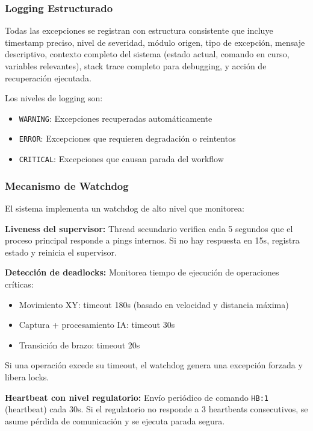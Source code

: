 \subsubsection{Logging Estructurado}

Todas las excepciones se registran con estructura consistente que incluye timestamp preciso, nivel de severidad, módulo origen, tipo de excepción, mensaje descriptivo, contexto completo del sistema (estado actual, comando en curso, variables relevantes), stack trace completo para debugging, y acción de recuperación ejecutada.

Los niveles de logging son:
\begin{itemize}[label=$\bullet$]
    \item \texttt{WARNING}: Excepciones recuperadas automáticamente
    \item \texttt{ERROR}: Excepciones que requieren degradación o reintentos
    \item \texttt{CRITICAL}: Excepciones que causan parada del workflow
\end{itemize}

\subsubsection{Mecanismo de Watchdog}

El sistema implementa un watchdog de alto nivel que monitorea:

\textbf{Liveness del supervisor:} Thread secundario verifica cada 5 segundos que el proceso principal responde a pings internos. Si no hay respuesta en 15s, registra estado y reinicia el supervisor.

\textbf{Detección de deadlocks:} Monitorea tiempo de ejecución de operaciones críticas:
\begin{itemize}[label=$\bullet$]
    \item Movimiento XY: timeout 180s (basado en velocidad y distancia máxima)
    \item Captura + procesamiento IA: timeout 30s
    \item Transición de brazo: timeout 20s
\end{itemize}

Si una operación excede su timeout, el watchdog genera una excepción forzada y libera locks.

\textbf{Heartbeat con nivel regulatorio:} Envío periódico de comando \texttt{HB:1} (heartbeat) cada 30s. Si el regulatorio no responde a 3 heartbeats consecutivos, se asume pérdida de comunicación y se ejecuta parada segura.

